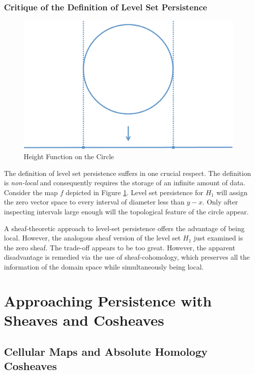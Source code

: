 \subsubsection{Critique of the Definition of Level Set Persistence}

\begin{figure}
\centering
\includegraphics[width=.9\textwidth]{presheaf_1.pdf}
\caption{Height Function on the Circle}
\label{fig:height_circle}
\end{figure}

The definition of level set persistence suffers in one crucial respect. The definition is \emph{non-local} and consequently requires the storage of an infinite amount of data. Consider the map $f$ depicted in Figure \ref{fig:height_circle}. Level set persistence for $H_1$ will assign the zero vector space to every interval of diameter less than $y-x$. Only after inspecting intervals large enough will the topological feature of the circle appear.

A sheaf-theoretic approach to level-set persistence offers the advantage of being local. However, the analogous sheaf version of the level set $H_1$ just examined is the zero sheaf. The trade-off appears to be too great. However, the apparent disadvantage is remedied via the use of sheaf-cohomology, which preserves all the information of the domain space while simultaneously being local.

\section{Approaching Persistence with Sheaves and Cosheaves}

\subsection{Cellular Maps and Absolute Homology Cosheaves}\label{subsec:abs_homology_cosheaves}

